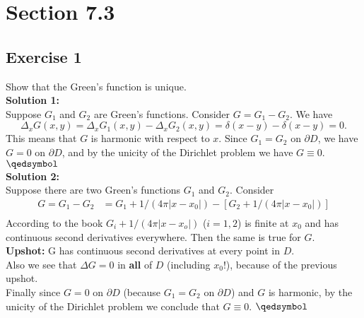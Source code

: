 \documentclass[12pt]{article}%
\begin{document}
\section*{Section 7.3}
\subsection*{Exercise 1}
Show that the Green's function is unique.\\
\textbf{Solution 1:}\\
Suppose $G_1$ and $G_2$ are Green's functions. Consider $G=G_1-G_2$. We have
\[
    \Delta_x G(x,y)=\Delta_x G_1(x,y)-\Delta_x G_2(x,y) = \delta(x-y) -
    \delta(x-y) =0.
\]
This means that $G$ is harmonic with respect to $x$. Since
$G_1=G_2$ on $\partial D$, we have $G=0$ on $\partial D$, and by the unicity of
the Dirichlet problem we have $G\equiv0$. $\qedsymbol$
\\\textbf{Solution 2:}\\
Suppose there are two Green's functions $G_1$ and $G_2$. Consider
\begin{align*}
    G=G_1-G_2&= G_1 + 1/(4\pi |x-x_0|) - [G_2 + 1/(4\pi |x-x_0|)]\\
\end{align*}
According to the book $G_i+1/(4\pi|x-x_o|)$ ($i=1,2$) is finite at $x_0$ and
has continuous second derivatives everywhere. Then the same is true for $G$.\\
\textbf{Upshot:} G has continuous second derivatives at every point in $D$.\\
Also we see that $\Delta G =0$ in \textbf{all} of $D$ (including $x_0$!),
because of the previous upshot.\\
Finally since $G=0$ on $\partial D$ (because $G_1=G_2$ on $\partial D$) and $G$
is harmonic, by the unicity of the Dirichlet problem we conclude that
$G\equiv0$. $\qedsymbol$
\end{document}
